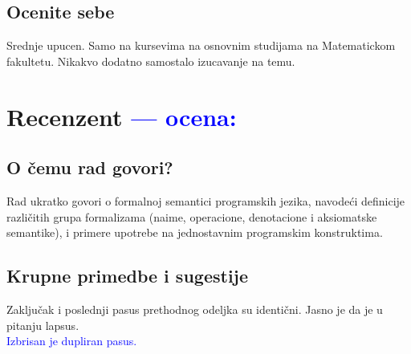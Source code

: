 \documentclass[a4paper]{report}
\newcommand{\odgovor}[1]{\textcolor{blue}{#1}}
\begin{document}
\section{Ocenite sebe}
Srednje upucen. Samo na kursevima na osnovnim studijama na Matematickom fakultetu. Nikakvo dodatno samostalo izucavanje na temu.


\chapter{Recenzent \odgovor{--- ocena:} }


\section{O čemu rad govori?}

Rad ukratko govori o formalnoj semantici programskih jezika, navodeći definicije različitih grupa formalizama (naime, operacione, denotacione i aksiomatske semantike), i 
primere upotrebe na jednostavnim programskim konstruktima.

\section{Krupne primedbe i sugestije}

Zaključak i poslednji pasus prethodnog odeljka su identični. Jasno je da je u pitanju lapsus.\\
\odgovor{Izbrisan je dupliran pasus.}\\
\end{document}
